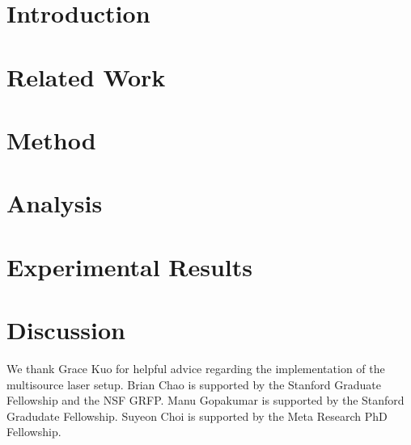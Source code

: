\documentclass[acmtog]{acmart}
\begin{document}
\maketitle

\section{Introduction}
\label{sec:intro}


\section{Related Work}
\label{sec:related}


\section{Method}
\label{sec:method}


\section{Analysis}
\label{sec:analysis}


\section{Experimental Results}
\label{sec:experiments}


\section{Discussion}
\label{sec:discussion}


\begin{acks}
We thank Grace Kuo for helpful advice regarding the implementation of the multisource laser setup. Brian Chao is supported by the Stanford Graduate Fellowship and the NSF GRFP. Manu Gopakumar is supported by the Stanford Gradudate Fellowship. Suyeon Choi is supported by the Meta Research PhD Fellowship.
\end{acks}
\end{document}
